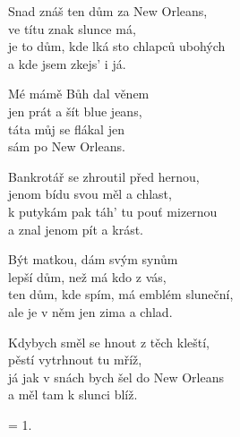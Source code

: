 
\ve{}
Snad znáš ten dům za New Orleans,\\
ve títu znak slunce má,\\
je to dům, kde lká sto chlapců ubohých\\
a kde jsem zkejs' i já. \quad {}

\ve{}
Mé mámě Bůh dal věnem\\
jen prát a šít blue jeans,\\
táta můj se flákal jen\\
sám po New Orleans.

\ve{}
Bankrotář se zhroutil před hernou,\\
jenom bídu svou měl a chlast,\\
k putykám pak táh' tu pouť mizernou\\
a znal jenom pít a krást.

\ve{}
Být matkou, dám svým synům\\
lepší dům, než má kdo z vás,\\
ten dům, kde spím, má emblém sluneční,\\
ale je v něm jen zima a chlad.

\ve{}
Kdybych směl se hnout z těch kleští,\\
pěstí vytrhnout tu mříž,\\
já jak v snách bych šel do New Orleans\\
a měl tam k slunci blíž. 

\ve{} = 1.

\esong